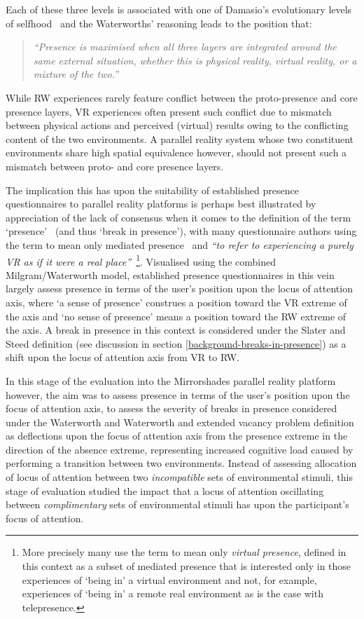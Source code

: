 Each of these three levels is associated with one of Damasio's evolutionary levels of selfhood~\cite{Damasio1999} and the Waterworths' reasoning leads to the position that:

\begin{quote}
\textit{``Presence is maximised when all three layers are integrated around the same external situation, whether this is physical reality, virtual reality, or a mixture of the two.''}~\cite{Mantovani2010}
\end{quote}

While RW experiences rarely feature conflict between the proto-presence and core presence layers, VR experiences often present such conflict due to mismatch between physical actions and perceived (virtual) results owing to the conflicting content of the two environments. A parallel reality system whose two constituent environments share high spatial equivalence however, should not present such a mismatch between proto- and core presence layers.

The implication this has upon the suitability of established presence questionnaires to parallel reality platforms is perhaps best illustrated by appreciation of the lack of consensus when it comes to the definition of the term `presence'~\cite{Calleja2014} (and thus `break in presence'), with many questionnaire authors using the term to mean only mediated presence~\cite{Mantovani2010} and \textit{``to refer to experiencing a purely VR as if it were a real place''}~\cite{Steed2014}\footnote{More precisely many use the term to mean only \textit{virtual presence}, defined in this context as a subset of mediated presence that is interested only in those experiences of `being in' a virtual environment and not, for example, experiences of `being in' a remote real environment as is the case with telepresence.}. Visualised using the combined Milgram/Waterworth model, established presence questionnaires in this vein largely assess presence in terms of the user's position upon the locus of attention axis, where `a sense of presence' construes a position toward the VR extreme of the axis and `no sense of presence' means a position toward the RW extreme of the axis. A break in presence in this context is considered under the Slater and Steed definition (see discussion in section \ref{background-breaks-in-presence}) as a shift upon the locus of attention axis from VR to RW.

In this stage of the evaluation into the Mirrorshades parallel reality platform however, the aim was to assess presence in terms of the user's position upon the focus of attention axis, to assess the severity of breaks in presence considered under the Waterworth and Waterworth and extended vacancy problem definition as deflections upon the focus of attention axis from the presence extreme in the direction of the absence extreme, representing increased cognitive load caused by performing a transition between two environments. Instead of assessing allocation of locus of attention between two \textit{incompatible} sets of environmental stimuli, this stage of evaluation studied the impact that a locus of attention oscillating between \textit{complimentary} sets of environmental stimuli has upon the participant's focus of attention.

